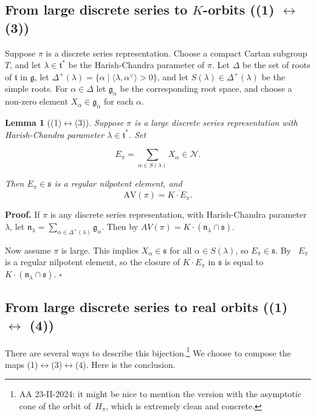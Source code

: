 \documentclass[10pt,leqno]{article}
\newtheorem{lemma}[equation]{Lemma}
\newcommand{\qed}{\hfill $\square$ \medskip}
\newenvironment{proof}[1][Proof]{\noindent\textbf{#1.} }{\qed}
\newcommand{\N}{\mathcal N}
\newcommand{\n}{\mathfrak n}
\newcommand{\ch}[1]{#1^\vee}
\renewcommand{\t}{\mathfrak t}
\newcommand{\g}{\mathfrak g}
\newcommand{\s}{\mathfrak s}
\newcommand{\AV}{\mathrm{AV}}
\begin{document}
\subsection{From large discrete series to $K$-orbits ((1) $\leftrightarrow$ (3))}

Suppose $\pi$ is a  discrete series representation. Choose a compact Cartan subgroup $T$, and let
$\lambda\in\t^*$ be the Harish-Chandra parameter of $\pi$. Let $\Delta$ be the set of roots of $\t$ in $\g$, 
let $\Delta^+(\lambda)=\{\alpha\mid \langle\lambda,\ch\alpha\rangle>0\}$,
and let $S(\lambda)\in\Delta^+(\lambda)$ be the simple roots.
For $\alpha\in \Delta$ let $\g_\alpha$ be the corresponding root space, and choose a non-zero element $X_\alpha\in\g_\alpha$ for each $\alpha$.

\begin{lemma}[(1)$\leftrightarrow$(3)]\label{l:pi_to_av}
Suppose $\pi$ is a large discrete series representation with Harish-Chandra parameter $\lambda\in\t^*$.
Set

\begin{equation}
  \label{e:Epi}
  E_\pi=\sum_{\alpha\in S(\lambda)}X_\alpha\in \N.
\end{equation}

Then $E_\pi\in\s$ is a regular nilpotent element, and
$$
\AV(\pi)=\overline{K\cdot E_\pi}.
$$
\end{lemma}

\begin{proof}
If $\pi$ is any discrete series representation, with Harish-Chandra parameter $\lambda$, let
$\n_{\lambda}=\sum_{\alpha\in\Delta^+(\lambda)}\g_\alpha$.
Then by \cite[Proposition 6.8]{vogan_irreducibility} $AV(\pi)=K\cdot(\n_\lambda\cap\s)$. 

Now assume $\pi$ is large. This implies $X_\alpha\in\s$ for all $\alpha\in S(\lambda)$, so $E_\pi\in \s$. 
By~\cite{kostant_tds} $E_\pi$ is a regular nilpotent element, so the closure of $K\cdot E_\pi$ in $\s$ is equal to $K\cdot(\n_\lambda\cap\s)$. 
\end{proof}




\subsection{From large discrete series to real orbits ((1) $\leftrightarrow$ (4))}


There are several ways to describe this bijection.\footnote{AA 23-II-2024: it might be nice to mention the version with the asymptotic cone of the orbit of~$H_\pi$, which is extremely clean and concrete. } We choose to compose the maps (1)$\leftrightarrow$(3)$\leftrightarrow$(4).
Here is the conclusion.
\end{document}
